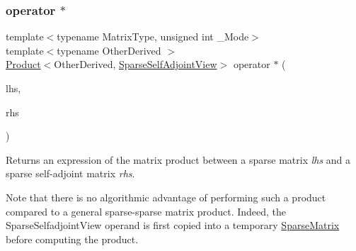 \subsubsection{\texorpdfstring{operator $\ast$}{operator *}\hspace{0.1cm}{\footnotesize\ttfamily [1/2]}}
{\footnotesize\ttfamily template$<$typename Matrix\+Type, unsigned int \+\_\+\+Mode$>$ \\
template$<$typename Other\+Derived $>$ \\
\mbox{\hyperlink{class_eigen_1_1_product}{Product}}$<$Other\+Derived, \mbox{\hyperlink{class_eigen_1_1_sparse_self_adjoint_view}{Sparse\+Self\+Adjoint\+View}}$>$ operator $\ast$ (\begin{DoxyParamCaption}\item[{const \mbox{\hyperlink{class_eigen_1_1_sparse_matrix_base}{Sparse\+Matrix\+Base}}$<$ Other\+Derived $>$ \&}]{lhs,  }\item[{const \mbox{\hyperlink{class_eigen_1_1_sparse_self_adjoint_view}{Sparse\+Self\+Adjoint\+View}}$<$ Matrix\+Type, \+\_\+\+Mode $>$ \&}]{rhs }\end{DoxyParamCaption})\hspace{0.3cm}{\ttfamily [friend]}}

\begin{DoxyReturn}{Returns}
an expression of the matrix product between a sparse matrix {\itshape lhs} and a sparse self-\/adjoint matrix {\itshape rhs}.
\end{DoxyReturn}
Note that there is no algorithmic advantage of performing such a product compared to a general sparse-\/sparse matrix product. Indeed, the Sparse\+Selfadjoint\+View operand is first copied into a temporary \mbox{\hyperlink{class_eigen_1_1_sparse_matrix}{Sparse\+Matrix}} before computing the product. \mbox{\label{class_eigen_1_1_sparse_self_adjoint_view_a041db67de7ff1e833befe8af97c49f7d}} 
